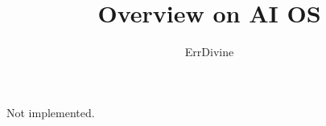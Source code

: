 \documentclass{article}
\title{Overview on AI OS}
\author{ErrDivine}
\begin{document}
\maketitle
Not implemented. 
\end{document}
